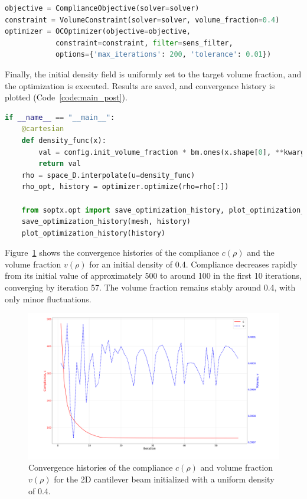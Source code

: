 \documentclass[mathpazo]{cicp}
\begin{document}
\begin{lstlisting}[language=python, caption={Optimization module}, label={code:optimizer}]
objective = ComplianceObjective(solver=solver)
constraint = VolumeConstraint(solver=solver, volume_fraction=0.4)
optimizer = OCOptimizer(objective=objective,
			constraint=constraint, filter=sens_filter,
			options={'max_iterations': 200, 'tolerance': 0.01})
\end{lstlisting}

Finally, the initial density field is uniformly set to the target volume fraction, and the optimization is executed. Results are saved, and convergence history is plotted (Code~\ref{code:main_post}).

\begin{lstlisting}[language=python, caption={Main program and post-processing}, label={code:main_post}]
if __name__ == "__main__":
	@cartesian
	def density_func(x):
		val = config.init_volume_fraction * bm.ones(x.shape[0], **kwargs)
		return val
	rho = space_D.interpolate(u=density_func)
	rho_opt, history = optimizer.optimize(rho=rho[:])
	
	from soptx.opt import save_optimization_history, plot_optimization_history
	save_optimization_history(mesh, history)
	plot_optimization_history(history)
\end{lstlisting}

Figure~\ref{fig:canti_04_convergence} shows the convergence histories of the compliance $c(\rho)$ and the volume fraction $v(\rho)$ for an initial density of 0.4. Compliance decreases rapidly from its initial value of approximately 500 to around 100 in the first 10 iterations, converging by iteration 57. The volume fraction remains stably around 0.4, with only minor fluctuations.
\begin{figure}[htb]
	\centering
	\includegraphics[width=1.0\textwidth]{figures/cantilever_2d_04_convergence.png}
	\caption{Convergence histories of the compliance $c(\rho)$ and volume fraction $v(\rho)$ for the 2D cantilever beam initialized with a uniform density of 0.4.}
	\label{fig:canti_04_convergence}
\end{figure}
\end{document}
